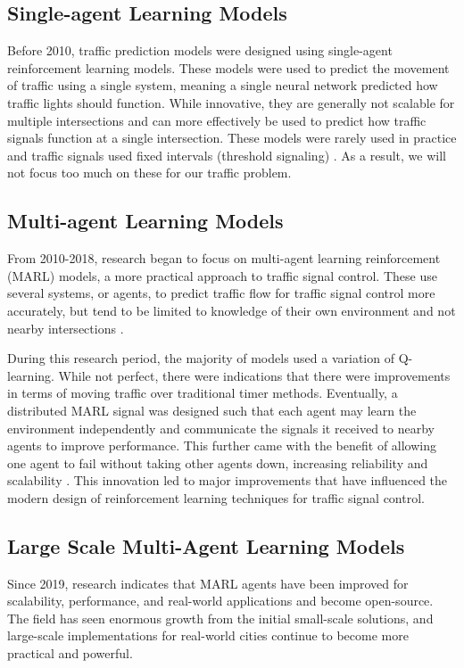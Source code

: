 \documentclass[conference]{IEEEtran}
\begin{document}
\subsection{Single-agent Learning Models}

Before 2010, traffic prediction models were designed using single-agent reinforcement learning models. These models were used to predict the movement of traffic using a single system, meaning a single neural network predicted how traffic lights should function. While innovative, they are generally not scalable for multiple intersections and can more effectively be used to predict how traffic signals function at a single intersection. These models were rarely used in practice and traffic signals used fixed intervals (threshold signaling) \cite{1}. As a result, we will not focus too much on these for our traffic problem. 

\subsection{Multi-agent Learning Models}

From 2010-2018, research began to focus on multi-agent learning reinforcement (MARL) models, a more practical approach to traffic signal control. These use several systems, or agents, to predict traffic flow for traffic signal control more accurately, but tend to be limited to knowledge of their own environment and not nearby intersections \cite{2}.

During this research period, the majority of models used a variation of Q-learning. While not perfect, there were indications that there were improvements in terms of moving traffic over traditional timer methods. \cite{2} Eventually, a distributed MARL signal was designed such that each agent may learn the environment independently and communicate the signals it received to nearby agents to improve performance. This further came with the benefit of allowing one agent to fail without taking other agents down, increasing reliability and scalability \cite{5}. This innovation led to major improvements that have influenced the modern design of reinforcement learning techniques for traffic signal control. 

\subsection{Large Scale Multi-Agent Learning Models}

Since 2019, research indicates that MARL agents have been improved for scalability, performance, and real-world applications and become open-source. The field has seen enormous growth from the initial small-scale solutions, and large-scale implementations for real-world cities continue to become more practical and powerful.
\end{document}

